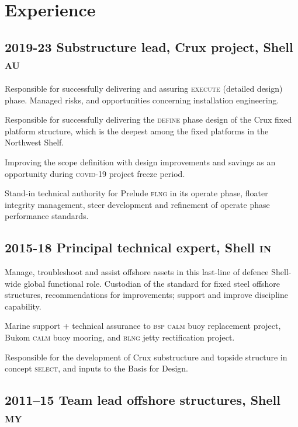 \section*{Experience} %
\label{sec:exp}

\subsection*{2019-23 Substructure lead, Crux project, Shell \textsc{au}} %
\label{sub:c1}

Responsible for successfully delivering and assuring \textsc{execute} (detailed design) phase. Managed risks, and opportunities concerning installation engineering.

Responsible for successfully delivering the \textsc{define} phase design of the Crux fixed platform structure, which is the deepest among the fixed platforms in the Northwest Shelf.

Improving the scope definition with design improvements and savings as an opportunity during \textsc{covid-19} project freeze period.

Stand-in technical authority for Prelude \textsc{flng} in its operate phase, floater integrity management, steer development and refinement of operate phase performance standards.


\subsection*{2015-18 Principal technical expert, Shell \textsc{in}} %
\label{sub:c2}

Manage, troubleshoot and assist offshore assets in this last-line of defence Shell-wide global functional role. Custodian of the standard for fixed steel offshore structures, recommendations for improvements; support and improve discipline capability.

Marine support + technical assurance to \textsc{bsp} \textsc{calm} buoy replacement project, Bukom \textsc{calm} buoy mooring, and \textsc{blng} jetty rectification project.

Responsible for the development of Crux substructure and topside structure in concept \textsc{select}, and inputs to the Basis for Design.


\subsection*{2011--15 Team lead offshore structures, Shell \textsc{my}} %
\label{sub:c3}

